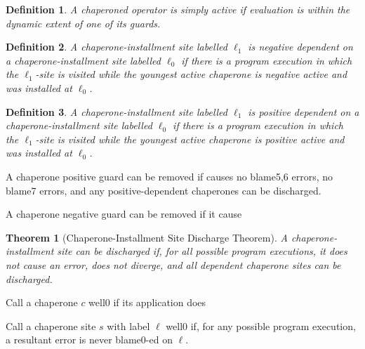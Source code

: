 \documentclass{sigplanconf}
\newtheorem{definition}{Definition}
\newtheorem{theorem}{Theorem}
\begin{document}


\begin{definition}
A chaperoned operator is simply \emph{active} if evaluation is within the dynamic extent of one of its guards.
\end{definition}

\begin{definition}
A chaperone-installment site labelled $\ell_1$ is \emph{negative dependent} on a chaperone-installment site labelled $\ell_0$ if there is a program execution in which the $\ell_1$-site is visited while the youngest active chaperone is negative active and was installed at $\ell_0$.
\end{definition}

\begin{definition}
A chaperone-installment site labelled $\ell_1$ is \emph{positive dependent} on a chaperone-installment site labelled $\ell_0$ if there is a program execution in which the $\ell_1$-site is visited while the youngest active chaperone is positive active and was installed at $\ell_0$.
\end{definition}

A chaperone positive guard can be removed if causes no blame5,6 errors, no blame7 errors, and any positive-dependent chaperones can be discharged.

A chaperone negative guard can be removed if it cause

\begin{theorem}[Chaperone-Installment Site Discharge Theorem]
A chaperone-installment site can be discharged if, for all possible program executions, it does not cause an error, does not diverge, and all dependent chaperone sites can be discharged.
\end{theorem}

Call a chaperone $c$ well0 if its application does

Call a chaperone site $s$ with label $\ell$ well0 if, for any possible program execution, a resultant error is never blame0-ed on $\ell$.
\end{document}
